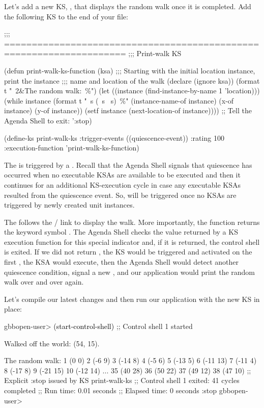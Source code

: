 \documentclass[10pt,twoside,english,pdftex]{article}
\begin{document}
%
%
%
%
%
Let's add a new KS, , that displays the random walk once
it is completed. Add the following KS to the end of your
 file:
%
\W\supp
\begin{example}
  ;;; ====================================================================
  ;;;   Print-walk KS

  (defun print-walk-ks-function (ksa)
    ;;; Starting with the initial location instance, print the instance 
    ;;; name and location of the walk
    (declare (ignore ksa))
    (format t "~2\&The random walk:~\%")
    (let ((instance (find-instance-by-name 1 'location)))
      (while instance
        (format t "~s (~s ~s)~\%"
                (instance-name-of instance)
                (x-of instance)
                (y-of instance))
        (setf instance (next-location-of instance))))
    ;; Tell the Agenda Shell to exit:
    ':stop)

  (define-ks print-walk-ks
    :trigger-events ((quiescence-event))
    :rating 100
    :execution-function 'print-walk-ks-function)
\end{example}
%
The  is triggered by a .  Recall
that the Agenda Shell signals that quiescence has occurred when no
executable KSAs are available to be executed and then it continues for an
additional KS-execution cycle in case any executable KSAs resulted from the
quiescence event.  So,  will be triggered once no
 KSAs are triggered by newly created  unit
instances.

The  follows the
/ link to display the walk.  More
importantly, the function returns the keyword symbol .  The Agenda
Shell checks the value returned by a KS execution function for this special
indicator and, if it is returned, the control shell is exited.  If we did not
return , the  KS would be triggered and
activated on the first , the KSA would execute, then
the Agenda Shell would detect another quiescence condition, signal a new
, and our application would print the random walk over
and over again.

Let's compile our latest changes and then run our application with the new
 KS in place:
%
\W\supp
\begin{example}
\textcolor{darkergray}{%
  gbbopen-user> \textcolor{black}{(start-control-shell)}
  ;; Control shell 1 started

  Walked off the world: (54, 15).

  The random walk:
  1 (0 0)
  2 (-6 9)
  3 (-14 8)
  4 (-5 6)
  5 (-13 5)
  6 (-11 13)
  7 (-11 4)
  8 (-17 8)
  9 (-21 15)
  10 (-12 14)
       ...
  35 (40 28)
  36 (50 22)
  37 (49 12)
  38 (47 10)
  ;; Explicit :stop issued by KS print-walk-ks
  ;; Control shell 1 exited: 41 cycles completed
  ;; Run time: 0.01 seconds
  ;; Elapsed time: 0 seconds
  :stop
  gbbopen-user>}
\end{example}
\end{document}
